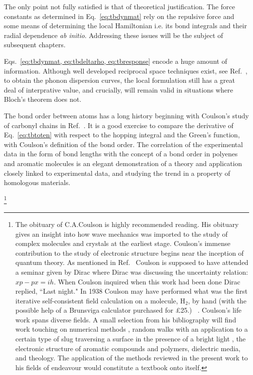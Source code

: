 The only point not fully satisfied is that of theoretical justification.
The force constants as determined in Eq.~\ref{eq:tbdynmat}
rely on the repulsive force and some means of determining 
the local Hamiltonian i.e. its bond integrals and their 
radial dependence {\it ab initio}. Addressing these issues
will be the subject of subsequent chapters. 
 
Eqs.~\ref{eq:tbdynmat, eq:tbdeltarho, eq:tbresponse} encode
a huge amount of information. Although well developed reciprocal space 
techniques exist, see Ref.~\cite{baroni01}, to obtain the phonon dispersion
curves, the local formulation still has a great deal of 
interprative value, and crucially, will remain valid
in situations where Bloch's theorem does not.

The bond order between atoms has a long history
beginning with Coulson's study of carbonyl 
chains in Ref.~\cite{coulson39,coulson47}. 
It is a good exercise to compare the derivative of Eq.~\ref{eq:tbtoten} with respect
to the hopping integral and the Green's function,
with Coulson's definition of the bond order\cite{coulson39}. 
The correlation of the experimental data in the form of bond lengths
with the concept of a bond order in polyenes and aromatic molecules
is an elegant demonstration of a theory and application closely
linked to experimental data, and studying the trend in a property
of homologous materials.

\footnote{The obituary of C.A.Coulson\cite{altmann74} 
is highly recommended reading. His obituary gives an insight into 
how wave mechanics was imported to the study of 
complex molecules and crystals at the earliest stage. Coulson's 
immense contribution to the study of electronic structure
begins near the inception of quantum theory. As mentioned in Ref.~\cite{altmann74}
Coulson is supposed to have attended a seminar given by Dirac 
where Dirac was discussing the uncertainty relation: $xp-px=ih$.
When Coulson inquired when this work had been done Dirac replied, 
``Last night." In 1938 Coulson may have performed what was
the first iterative self-consistent field calculation
on a molecule, H$_2$, by hand (with the possible help of a 
Brunsviga calculator purchased for \pounds 25.)
~\cite{coulson38}. Coulson's life work spans diverse fields.
A small selection from his bibliography will find work 
touching on numerical methods \cite{coulson37,coulson42}, 
random walks with an application to a certain type of slug 
traversing a surface in the presence of a bright light \cite{coulson47}, 
the electronic structure of aromatic compounds and polymers, 
dielectric media, and theology. The application of the methods 
reviewed in the present work to his fields of endeavour would 
constitute a textbook onto itself.}

